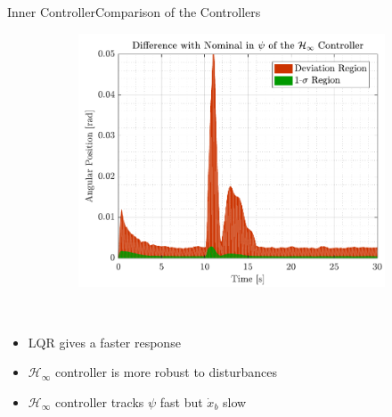 \begin{frame}{Inner Controller}{Comparison of the Controllers}
\begin{figure}[H]
\begin{minipage}{0.45\linewidth}
\begin{figure}[H]
        \includegraphics[width=1\linewidth]{figures/yaw_mc_rob_error}
      \end{figure}                
    \end{minipage}\hfill \\
  \end{figure}
    \begin{itemize}
      \item LQR gives a faster response
      \item $\mathcal{H}_\infty$ controller is more robust to disturbances
      \item $\mathcal{H}_\infty$ controller tracks $\psi$ fast but $\dot{x}_b$ slow
    \end{itemize}
\end{frame}

